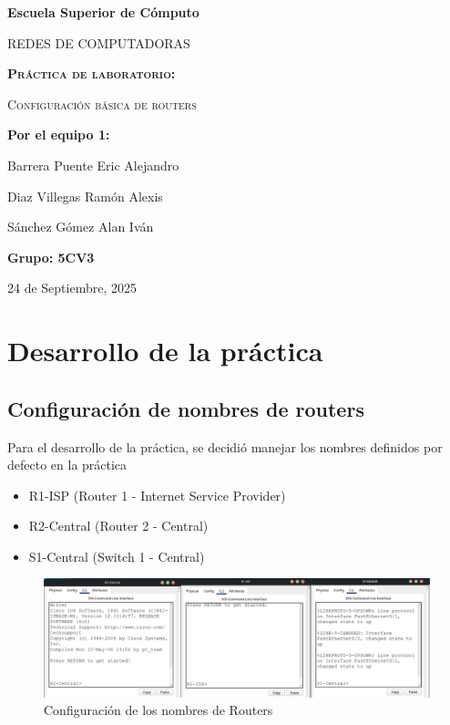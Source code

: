 \documentclass[a4paper,11pt]{article}
\begin{document}
\vspace{0.4cm}

\begin{titlepage}
    \centering
    {\bfseries\LARGE Escuela Superior de Cómputo \par}
    \vspace{1cm}
    {\scshape\Large REDES DE COMPUTADORAS \par}
    \vspace{5cm}
    {\scshape\Huge \textbf{Práctica de laboratorio:} \par}
    {\scshape\Huge Configuración básica de routers \par}
    \vfill
    {\Large \textbf{Por el equipo 1:} \par}
    {\Large Barrera Puente Eric Alejandro \par}
    {\Large Diaz Villegas Ramón Alexis \par}
    {\Large Sánchez Gómez Alan Iván \par}
    \vspace{1cm}
    {\Large \textbf{Grupo: 5CV3} \par}
    \vfill
    {\Large 24 de Septiembre, 2025 \par}
\end{titlepage}

\tableofcontents %
\newpage

\listoffigures
\newpage

\justify
\section{Desarrollo de la práctica}
\subsection{Configuración de nombres de routers}
Para el desarrollo de la práctica, se decidió manejar los nombres definidos por
defecto en la práctica
\begin{itemize}
    \item R1-ISP (Router 1 - Internet Service Provider)
    \item R2-Central (Router 2 - Central)
    \item S1-Central (Switch 1 - Central)
\end{itemize}

\begin{figure}[h]
    \includegraphics[width=1\textwidth]{images/figure1.png}
    \caption{Configuración de los nombres de Routers}
\end{figure}
\end{document}
